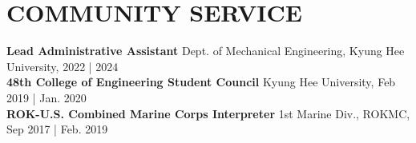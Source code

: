 \documentclass[a4paper,10pt]{extarticle}
\begin{document}


\section*{COMMUNITY SERVICE}
\textbf{Lead Administrative Assistant} \hfill Dept. of Mechanical Engineering, Kyung Hee University, 2022 | 2024\\
\textbf{48th College of Engineering Student Council} \hfill Kyung Hee University, Feb 2019 | Jan. 2020\\
\textbf{ROK-U.S. Combined Marine Corps Interpreter} \hfill 1st Marine Div., ROKMC, Sep 2017 | Feb. 2019
\end{document}
